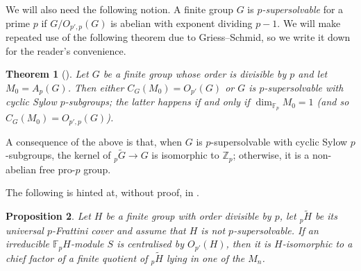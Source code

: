 \documentclass[10pt,a4paper]{amsart}
\newtheorem{thm}{Theorem}[section]
\newtheorem{proposition}[thm]{Proposition}
\begin{document}
We will also need the following notion. A finite group $G$ is \emph{$p$-supersolvable} for a prime $p$ if $G/O_{p',p}(G)$ is abelian with exponent dividing $p-1$. We will make repeated use of the following theorem due to Griess--Schmid, so we write it down for the reader's convenience.

\begin{thm}[{{\cite[Theorem 3]{GS78}}}]\label{t:cent_frattini}
    Let $G$ be a finite group whose order is divisible by $p$ and let $M_0=A_{p}(G)$. Then either $C_G(M_0) = O_{p'}(G)$ or $G$ is $p$-supersolvable with cyclic Sylow $p$-subgroups; the latter happens if and only if $\dim_{\mathbb F_p}M_0=1$ (and so $C_G(M_0)=O_{p',p}(G)$).
\end{thm}

A consequence of the above is that, when $G$ is $p$-supersolvable with cyclic Sylow $p$-subgroups, the kernel of ${}_p\widetilde G \to G$ is isomorphic to $\mathbb Z_p$; otherwise, it is a non-abelian free pro-$p$ group.

The following is hinted at, without proof, in \cite{CKK}.

\begin{proposition}\label{p:comp_factor}
    Let $H$ be a finite group with order divisible by $p$, let $_p \widetilde H$ be its universal $p$-Frattini cover and assume that $H$ is not $p$-supersolvable. If an irreducible $\mathbb F_pH$-module $S$ is centralised by $O_{p'}(H)$, then it is $H$-isomorphic to a chief factor of a finite quotient of $_p \widetilde H$ lying in one of the $M_n$.
\end{proposition}
\end{document}
